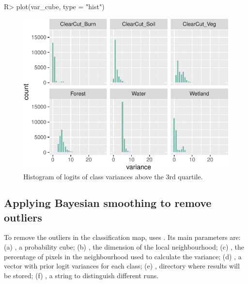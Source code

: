 \documentclass[
]{jss}
\begin{document}
\begin{CodeChunk}
\begin{CodeInput}
R> plot(var_cube, type = "hist")
\end{CodeInput}
\begin{figure}[h]

{\centering \includegraphics{Bayesian_smoothing_JSS_files/figure-latex/vhist-1} 

}

\caption[Histogram of logits of class variances above the 3rd quartile]{Histogram of logits of class variances above the 3rd quartile.}\label{fig:vhist}
\end{figure}
\end{CodeChunk}

\hypertarget{applying-bayesian-smoothing-to-remove-outliers}{%
\subsection{Applying Bayesian smoothing to remove outliers}\label{applying-bayesian-smoothing-to-remove-outliers}}

To remove the outliers in the classification map,  uses . Its main parameters are: (a) , a probability cube; (b) , the dimension of the local neighbourhood; (c) , the percentage of pixels in the neighbourhood used to calculate the variance; (d) , a vector with prior logit variances for each class; (e) , directory where results will be stored; (f) , a string to distinguish different runs.
\end{document}
